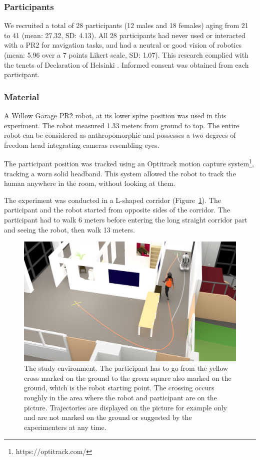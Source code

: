 \documentclass[a4paper,11pt,twoside]{StyleThese}
\begin{document}
\subsubsection{Participants}
We recruited a total of 28 participants (12 males and 18 females) aging from 21 to 41 (mean: 27.32, SD: 4.13). All 28 participants had never used or interacted with a PR2 for navigation tasks, and had a neutral or good vision of robotics (mean: 5.96 over a 7 points Likert scale, SD: 1.07). This research complied with the tenets of Declaration of Helsinki \cite{world2013world}. Informed consent was obtained from each participant.

\subsubsection{Material}
A Willow Garage PR2 robot, at its lower spine position was used in this experiment. The robot measured 1.33 meters from ground to top. The entire robot can be considered as anthropomorphic and possesses a two degrees of freedom head integrating cameras resembling eyes.

The participant position was tracked using an Optitrack motion capture system\footnote{https://optitrack.com/}, tracking a worn solid headband. This system allowed the robot to track the human anywhere in the room, without looking at them.

The experiment was conducted in a L-shaped corridor (Figure~\ref{fig:experiment_adream}). The participant and the robot started from opposite sides of the corridor. The participant had to walk 6 meters before entering the long straight corridor part and seeing the robot, then walk 13 meters.

\begin{figure}[hbtp]
\centering
\includegraphics[width=\textwidth]{figures/chapter2/expe_human-min.png}
\caption{The  study  environment.  The  participant  has  to  go  from  the  yellow  cross  marked  on  the  ground  to  the  green  square  also  marked  on  the  ground, which is the robot starting point. The crossing occurs roughly in the area where the robot and participant are on the picture. Trajectories are displayed on the picture for example only and are not marked on the ground or suggested by the experimenters at any time.}
\label{fig:experiment_adream}
\end{figure}
\end{document}

